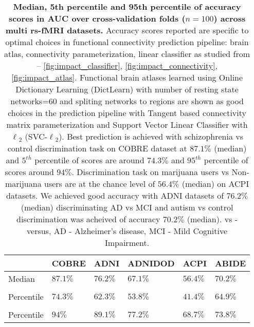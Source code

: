 \documentclass[5p]{elsarticle}
\begin{document}
\begin{table}[tb]
\small
\begin{tabularx}{\linewidth}{p{1.2cm}|p{1.0cm}|p{0.7cm}|p{1.42cm}|l|l}
    \rowcolor{gray!50}
    \centering{Accuracy} & COBRE & ADNI & ADNIDOD & ACPI & ABIDE \\
    \hline
    \rowcolor{gray!13}
    Median& $87.1\%$ & $76.2\%$ & $67.1\%$ & $56.4\%$ & $70.2\%$\\
    {\centering $5^{th}$ \\ Percentile} & $74.3\%$ & $62.3\%$ &
    $53.8\%$ & $41.4\%$ & $64.9\%$\\[.1ex]
    \rowcolor{gray!13}
    {\centering $95^{th}$ \\ Percentile} & $94\%$ & $89.1\%$ &
    $77.2\%$ & $68.7\%$ & $73.8\%$\\
    \hline
\end{tabularx}
    \caption{\textbf{
            Median, 5th percentile and 95th percentile of accuracy scores in AUC
            over cross-validation folds ($n=100$) across multi rs-fMRI datasets.}
            Accuracy scores reported are specific to optimal choices in
            functional connectivity prediction pipeline: brain atlas,
            connectivity parameterization, linear classifier as studied
            from -- \autoref{fig:impact_classifier},
            \autoref{fig:impact_connectivity}, \autoref{fig:impact_atlas}.
            Functional brain atlases
            learned using Online Dictionary Learning (DictLearn) with
            number of resting state networks=$60$ and spliting networks to regions are
            shown as good choices in the prediction pipeline with Tangent based
            connectivity matrix parameterization and Support Vector Linear
            Classifier with $\ell{_2}$ (SVC-$\ell{_2}$).
            Best prediction is achieved with schizophrenia vs control
            discrimination task on COBRE dataset at $87.1\%$ (median) and
            $5^{th}$ percentile of scores are around $74.3\%$ and $95^{th}$
            percentile of scores around $94\%$. Discrimination task on marijuana
            users vs Non-marijuana users are at the chance level of $56.4\%$
            (median) on ACPI
            datasets. We achieved good accuracy with ADNI datasets of $76.2\%$
            (median) discriminating AD vs MCI and autism vs control
            discrimination was acheived of accuracy $70.2\%$ (median).
            vs - versus, AD - Alzheimer's disease, MCI - Mild Cognitive
            Impairment.}
    \label{tab:scores}
\end{table}
\end{document}
